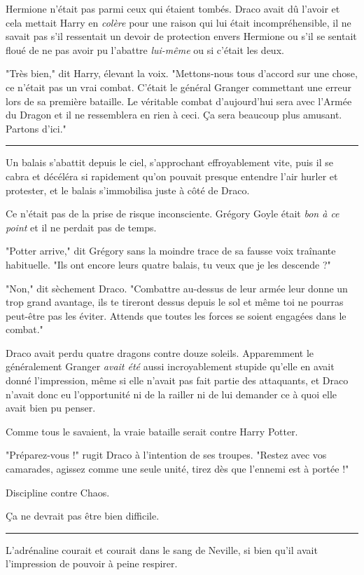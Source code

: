 Hermione n'était pas parmi ceux qui étaient tombés. Draco avait dû l'avoir et cela mettait Harry en \emph{colère}  pour une raison qui lui était incompréhensible, il ne savait pas s'il ressentait un devoir de protection envers Hermione ou s'il se sentait floué de ne pas avoir pu l'abattre \emph{lui-même}  ou si c'était les deux.

"Très bien," dit Harry, élevant la voix. "Mettons-nous tous d'accord sur une chose, ce n'était pas un vrai combat. C'était le général Granger commettant une erreur lors de sa première bataille. Le véritable combat d'aujourd'hui sera avec l'Armée du Dragon et il ne ressemblera en rien à ceci. Ça sera beaucoup plus amusant. Partons d'ici."
\par\noindent\rule{\textwidth}{0.4pt}
Un balais s'abattit depuis le ciel, s'approchant effroyablement vite, puis il se cabra et décéléra si rapidement qu'on pouvait presque entendre l'air hurler et protester, et le balais s'immobilisa juste à côté de Draco.

Ce n'était pas de la prise de risque inconsciente. Grégory Goyle était \emph{bon à ce point}  et il ne perdait pas de temps.

"Potter arrive," dit Grégory sans la moindre trace de sa fausse voix traînante habituelle. "Ils ont encore leurs quatre balais, tu veux que je les descende ?"

"Non," dit sèchement Draco. "Combattre au-dessus de leur armée leur donne un trop grand avantage, ils te tireront dessus depuis le sol et même toi ne pourras peut-être pas les éviter. Attends que toutes les forces se soient engagées dans le combat."

Draco avait perdu quatre dragons contre douze soleils. Apparemment le généralement Granger \emph{avait été}  aussi incroyablement stupide qu'elle en avait donné l'impression, même si elle n'avait pas fait partie des attaquants, et Draco n'avait donc eu l'opportunité ni de la railler ni de lui demander ce à quoi elle avait bien pu penser.

Comme tous le savaient, la vraie bataille serait contre Harry Potter.

"Préparez-vous !" rugit Draco à l'intention de ses troupes. "Restez avec vos camarades, agissez comme une seule unité, tirez dès que l'ennemi est à portée !"

Discipline contre Chaos.

Ça ne devrait pas être bien difficile.
\par\noindent\rule{\textwidth}{0.4pt}
L'adrénaline courait et courait dans le sang de Neville, si bien qu'il avait l'impression de pouvoir à peine respirer.

